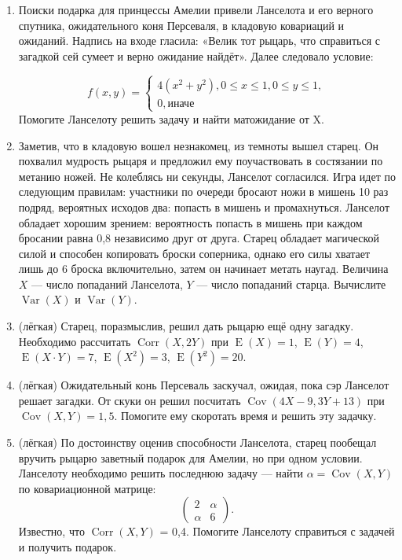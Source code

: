 \documentclass[a4paper,12pt]{article}
\DeclareMathOperator{\Cov}{Cov}
\DeclareMathOperator{\Corr}{Corr}
\DeclareMathOperator{\Var}{Var}
\DeclareMathOperator{\E}{E}
\begin{document}
\begin{enumerate} %
\item Поиски подарка для принцессы Амелии привели Ланселота и его верного спутника, ожидательного коня Персеваля, в кладовую ковариаций и ожиданий. Надпись на входе гласила: «Велик тот рыцарь, что справиться с загадкой сей сумеет и верно ожидание найдёт». Далее следовало условие:

\[
   f(x, y)=
   \begin{cases}
   4(x^2 + y^2), 0 \leq x \leq 1, 0 \leq y \leq 1, \\
    0, \text{иначе}
    \end{cases}
\]
Помогите Ланселоту решить задачу и найти матожидание от X.
\item Заметив, что в кладовую вошел незнакомец, из темноты вышел старец. 
Он похвалил мудрость рыцаря и предложил ему поучаствовать в состязании по метанию ножей. 
Не колеблясь ни секунды, Ланселот согласился. Игра идет по следующим правилам: 
участники по очереди бросают ножи в мишень 10 раз подряд, вероятных исходов два: попасть в мишень и промахнуться. 
Ланселот обладает хорошим зрением: вероятность попасть в мишень при каждом бросании равна 0,8 независимо друг от друга. Старец обладает магической силой и способен копировать броски соперника, однако его силы хватает лишь до 6 броска включительно, затем он начинает метать наугад. 
Величина $X$ — число попаданий Ланселота, $Y$ — число попаданий старца. Вычислите $\Var(X)$ и $\Var(Y)$.
\item (лёгкая) Старец, поразмыслив, решил дать рыцарю ещё одну загадку. Необходимо рассчитать $\Corr(X, 2Y)$ при $\E(X)=1$, $\E(Y)=4$, $\E(X\cdot Y)=7$, $\E(X^2)=3$, $\E(Y^2)=20$.
\item (лёгкая) Ожидательный конь Персеваль заскучал, ожидая, пока сэр Ланселот решает загадки. От скуки он решил посчитать $\Cov(4X-9, 3Y+13)$ при $\Cov(X, Y)=1,5$. Помогите ему скоротать время и решить эту задачку.
\item (лёгкая) По достоинству оценив способности Ланселота, старец пообещал вручить рыцарю заветный подарок для Амелии, но при одном условии. Ланселоту необходимо решить последнюю задачу — найти $\alpha = \Cov(X, Y)$ по ковариационной матрице:
\[
\begin{pmatrix}
2 & \alpha \\
\alpha & 6
\end{pmatrix}.
\]
Известно, что $\Corr(X, Y) $ = 0,4.
Помогите Ланселоту справиться с задачей и получить подарок.
\end{enumerate}
\end{document}
